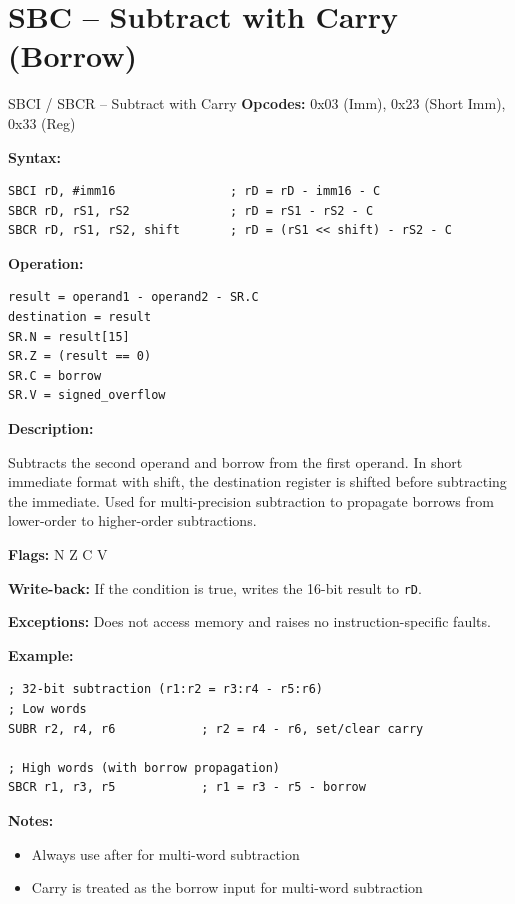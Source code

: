 \section{SBC -- Subtract with Carry (Borrow)}

\begin{instructionbox}{SBCI / SBCR -- Subtract with Carry}
	\textbf{Opcodes:} 0x03 (Imm), 0x23 (Short Imm), 0x33 (Reg)

	\textbf{Syntax:}
	\begin{lstlisting}
SBCI rD, #imm16                ; rD = rD - imm16 - C
SBCR rD, rS1, rS2              ; rD = rS1 - rS2 - C
SBCR rD, rS1, rS2, shift       ; rD = (rS1 << shift) - rS2 - C
\end{lstlisting}

	\textbf{Operation:}
	\begin{verbatim}
result = operand1 - operand2 - SR.C
destination = result
SR.N = result[15]
SR.Z = (result == 0)
SR.C = borrow
SR.V = signed_overflow
\end{verbatim}

	\textbf{Description:}

	Subtracts the second operand and borrow from the first operand. In short immediate format with
	shift, the destination register is shifted before subtracting the immediate. Used for multi-precision subtraction to
	propagate borrows from lower-order to higher-order subtractions.

	\textbf{Flags:} N Z C V

	\textbf{Write-back:} If the condition is true, writes the 16-bit result to \texttt{rD}.

	\textbf{Exceptions:} Does not access memory and raises no instruction-specific faults.

	\textbf{Example:}
	\begin{lstlisting}
; 32-bit subtraction (r1:r2 = r3:r4 - r5:r6)
; Low words
SUBR r2, r4, r6            ; r2 = r4 - r6, set/clear carry

; High words (with borrow propagation)
SBCR r1, r3, r5            ; r1 = r3 - r5 - borrow
\end{lstlisting}

	\textbf{Notes:}
	\begin{itemize}
		\item Always use after  for multi-word subtraction
		\item Carry is treated as the borrow input for multi-word subtraction
	\end{itemize}
\end{instructionbox}

